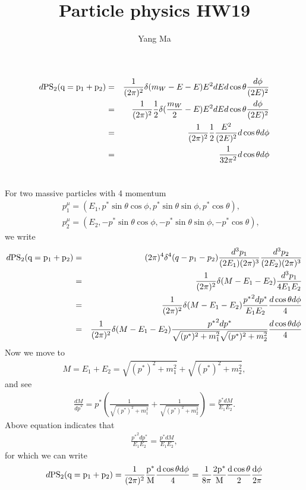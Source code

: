 \documentclass[11pt]{article}
\def\th{\theta}
\def\PS{\rm PS}
\begin{document}
\title{Particle physics HW19}
\author{Yang Ma}

\maketitle

\section{ }
\begin{eqnarray}
    d\PS_2(q=p_1+p_2)
  &=& \frac{1}{(2\pi)^2} \delta(m_W-E-E) E^2dE d\cos\theta \frac{d\phi}{(2E)^2} \\
  &=& \frac{1}{(2\pi)^2} \frac{1}{2} \delta(\frac{m_W}{2}-E) E^2dE d\cos\theta \frac{d\phi}{(2E)^2} \\
  &=& \frac{1}{(2\pi)^2}\frac{1}{2} \frac{E^2}{(2E)^2} d\cos\theta d\phi \\
  &=& \frac{1}{32\pi^2} d\cos\theta d\phi
\end{eqnarray}

\section{ }
For two massive particles with 4 momentum
\begin{eqnarray}
  &&p_1^\mu = (E_1, p^* \sin\theta\cos\phi, p^* \sin\theta\sin\phi, p^* \cos\theta), \nonumber \\
  &&p_2^\mu = (E_2,-p^* \sin\theta\cos\phi, -p^* \sin\theta\sin\phi, -p^* \cos\theta),
\end{eqnarray}
we write
\begin{eqnarray}
  d\PS_2(q=p_1+p_2)
&=& (2\pi)^4 \delta^4(q-p_1-p_2)
  \frac{ d^3p_1}{(2E_1)(2\pi)^3 }\frac{ d^3p_2}{(2E_2)(2\pi)^3 } \\
&=& \frac{1}{(2\pi)^2} \delta (M-E_1-E_2)\frac{ d^3p_1}{4E_1 E_2 } \\
&=& \frac{1}{(2\pi)^2} \delta (M-E_1-E_2)\frac{ {p^*}^2dp^*}{E_1 E_2 } \frac{d\cos\th d\phi}{4}\\
&=& \frac{1}{(2\pi)^2} \delta (M-E_1-E_2)\frac{ {p^*}^2dp^*}{\sqrt{ (p^*)^2 + m_1^2 } \sqrt{ (p^*)^2 + m_2^2 } } \frac{d\cos\th d\phi}{4}
\end{eqnarray}
Now we move to
\begin{eqnarray}
  M=E_1+E_2=\sqrt{ (p^*)^2 + m_1^2 } + \sqrt{ (p^*)^2 + m_2^2 },
\end{eqnarray}
and see
\begin{eqnarray}
  \frac{dM}{dp^*}=p^*\left(\frac{1}{\sqrt{ (p^*)^2 + m_1^2 }}+\frac{1}{\sqrt{ (p^*)^2 + m_2^2 }}\right)=\frac{p^*dM}{E_1E_2}.
\end{eqnarray}
Above equation indicates that
\begin{eqnarray}
  \frac{{p^*}^2dp^*}{E_1E_2}=\frac{p^*dM}{E_1E_2},
\end{eqnarray}
for which we can write
\begin{eqnarray}
  d\PS_2(q=p_1+p_2) =\frac{1}{(2\pi)^2}\frac{p^*}{M}\frac{d\cos\th d\phi}{4}=\frac{1}{8\pi} \frac{2p^*}{M} \frac{ d\cos\theta}{2} \frac{d\phi}{2\pi}
\end{eqnarray}
\end{document}
